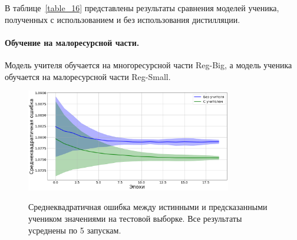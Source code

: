 \begin{table}[h!t]
\begin{center}
\caption{Качество моделей}
\label{table_16}
\end{center}
\end{table}

В таблице~\ref{table_16} представлены результаты сравнения моделей ученика, полученных с использованием и без использования дистилляции.

\paragraph{Обучение на малоресурсной части.}
Модель учителя обучается на многоресурсной части Reg-Big, а модель ученика обучается на малоресурсной части Reg-Small.

\begin{figure}[h!t]\center
{\includegraphics[width=0.8\textwidth]{results/reg_small_loss}}\\
\caption{Среднеквадратичная ошибка между истинными и предсказанными учеником значениями на тестовой выборке. Все результаты усреднены по 5 запускам.}
\end{figure}

